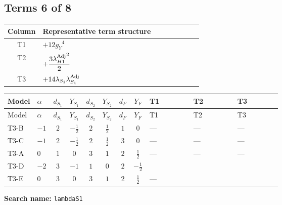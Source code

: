 \documentclass[8pt]{article}
\begin{document}
\begin{landscape}
\subsection*{Terms 6 of 8}
\begin{center}
\begin{tabular}{@{}c >{\raggedright\arraybackslash}p{0.82\linewidth}@{}}
\toprule
Column & Representative term structure \\
\midrule
T1 & \(\displaystyle +12 {g_Y}^4\) \\
\midrule
T2 & \(\displaystyle +\frac{3 {\lambda_{H1}^{\rm Adj}}^2}{2}\) \\
\midrule
T3 & \(\displaystyle +14 {\lambda_{S_1}} {\lambda_{S_1}^{\rm Adj}}\) \\
\midrule
\bottomrule
\end{tabular}
\end{center}
\smallskip
\tiny
\begin{longtable}{@{}llcccccc >{\raggedright\arraybackslash}p{0.21\linewidth} >{\raggedright\arraybackslash}p{0.21\linewidth} >{\raggedright\arraybackslash}p{0.21\linewidth}@{}}
\toprule
Model & $\alpha$ & $d_{S_1}$ & $Y_{S_1}$ & $d_{S_2}$ & $Y_{S_2}$ & $d_F$ & $Y_F$ & T1 & T2 & T3 \\
\midrule
\endfirsthead
\toprule
Model & $\alpha$ & $d_{S_1}$ & $Y_{S_1}$ & $d_{S_2}$ & $Y_{S_2}$ & $d_F$ & $Y_F$ & T1 & T2 & T3 \\
\midrule
\endhead
T3-B & $-1$ & $2$ & $-\frac{1}{2}$ & $2$ & $\frac{1}{2}$ & $1$ & $0$ & --- & --- & --- \\
\midrule
T3-C & $-1$ & $2$ & $-\frac{1}{2}$ & $2$ & $\frac{1}{2}$ & $3$ & $0$ & --- & --- & --- \\
\midrule
T3-A & $0$ & $1$ & $0$ & $3$ & $1$ & $2$ & $\frac{1}{2}$ & --- & --- & --- \\
\midrule
T3-D & $-2$ & $3$ & $-1$ & $1$ & $0$ & $2$ & $-\frac{1}{2}$ & \scriptsize\adjustbox{max width=\linewidth}{$\begin{gathered} +12 {g_Y}^4\end{gathered}$} & \scriptsize\adjustbox{max width=\linewidth}{$\begin{gathered} +\frac{3 {\lambda_{H1}^{\rm Adj}}^2}{2}\end{gathered}$} & \scriptsize\adjustbox{max width=\linewidth}{$\begin{gathered} +14 {\lambda_{S_1}} {\lambda_{S_1}^{\rm Adj}}\end{gathered}$} \\
\midrule
T3-E & $0$ & $3$ & $0$ & $3$ & $1$ & $2$ & $\frac{1}{2}$ & --- & \scriptsize\adjustbox{max width=\linewidth}{$\begin{gathered} +\frac{3 {\lambda_{H1}^{\rm Adj}}^2}{2}\end{gathered}$} & \scriptsize\adjustbox{max width=\linewidth}{$\begin{gathered} +14 {\lambda_{S_1}} {\lambda_{S_1}^{\rm Adj}}\end{gathered}$} \\
\midrule
\bottomrule
\end{longtable}
\clearpage
\noindent\textbf{Search name: }\texttt{lambdaS1}\par\smallskip

\end{landscape}
\end{document}
